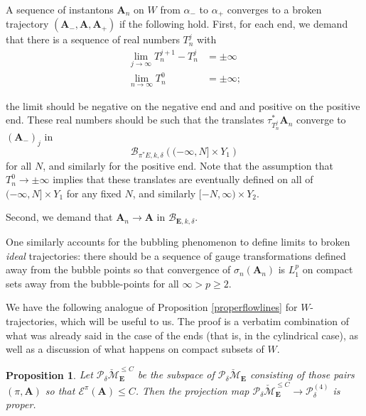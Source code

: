 \documentclass{memo-l}
\newcommand{\pE}{\pi^* \! E}
\newtheorem{proposition}[theorem]{Proposition}
\theoremstyle{definition}
\theoremstyle{remark}
\numberwithin{section}{chapter}
\numberwithin{equation}{chapter}
\begin{document}
A sequence of instantons $\mathbf{A}_n$ on $W$ from $\alpha_-$ to $\alpha_+$ converges to a broken trajectory $(\mathbf{A}_-, \mathbf{A}, \mathbf{A}_+)$ if the following hold. First, for each end, we demand that there is a sequence of real numbers $T_n^j$ with 
\begin{align*}
\lim_{j \to \infty} T_n^{j+1} - T_n^j &= \pm \infty \\
\lim_{n \to \infty} T_n^0 &= \pm \infty;
\end{align*}

the limit should be negative on the negative end and and positive on the positive end. These real numbers should be such that the translates $\tau_{T_n^j}^* \mathbf{A}_n$ converge to $(\mathbf{A}_-)_j$ in 
$$\mathcal B_{\pE,k,\delta}\left((-\infty, N] \times Y_1\right)$$ 
for all $N$, and similarly for the positive end. Note that the assumption that $T_n^0 \to \pm \infty$ implies that these translates are eventually defined on all of $(-\infty, N] \times Y_1$ for any fixed $N$, and similarly $[-N, \infty) \times Y_2$. 

Second, we demand that $\mathbf{A}_n \to \mathbf{A}$ in $\mathcal B_{\mathbf{E},k,\delta}$. 

One similarly accounts for the bubbling phenomenon to define limits to broken \textit{ideal} trajectories: there should be a sequence of gauge transformations defined away from the bubble points so that convergence of $\sigma_n(\mathbf{A}_n)$ is $L^p_1$ on compact sets away from the bubble-points for all $\infty > p \geq 2$. 

We have the following analogue of Proposition \ref{properflowlines} for $W$-trajectories, which will be useful to us. The proof is a verbatim combination of what was already said in the case of the ends (that is, in the cylindrical case), as well as a discussion of what happens on compact subsets of $W$.

\begin{proposition}\label{propertrajectories}Let $\mathcal P_{\delta} \check{\mathcal M}_{\mathbf{E}}^{\leq C}$ be the subspace of $\mathcal P_{\delta} \check{\mathcal M}_{\mathbf{E}}$ consisting of those pairs $(\pi, \mathbf{A})$ so that $\mathcal E^\pi(\mathbf{A}) \leq C$. Then the projection map $\mathcal P_{\delta} \check{\mathcal M}_{\mathbf{E}}^{\leq C} \to \mathcal P^{(4)}_{\delta}$ is proper.\end{proposition}
\end{document}

